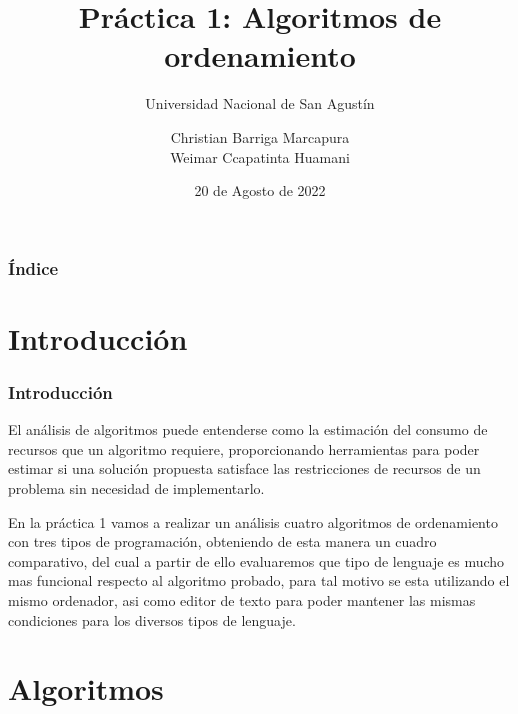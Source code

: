 \documentclass{beamer}
\title[Algoritmos y Estructura de datos]{Práctica 1: Algoritmos de ordenamiento}
\subtitle{Universidad Nacional de San Agustín}
\author{Christian Barriga Marcapura\\
        Weimar Ccapatinta Huamani}
\institute[Universidad Nacional de San Agustín]
{
  Universidad Nacional de San Agustín\\
    \and
    Seminario de Tesis\\
   \and
}
\date{20 de Agosto de 2022}
\begin{document}
\begin{frame}
  \frametitle{Índice}
  \tableofcontents
\end{frame}

\section{Introducción}
\begin{frame}
  \frametitle{Introducción}
  \begin{block}{}
El análisis de algoritmos puede entenderse como la estimación del consumo de recursos que un algoritmo requiere, proporcionando herramientas para poder estimar si una solución propuesta satisface las restricciones de recursos de un problema sin necesidad de implementarlo.
  \end{block}
    \begin{block}{}
  En la práctica 1 vamos a realizar un análisis cuatro algoritmos de ordenamiento con tres tipos de programación, obteniendo de esta manera un cuadro comparativo, del cual a partir de ello evaluaremos que tipo de lenguaje es mucho mas funcional respecto al algoritmo probado, para tal motivo se esta utilizando el mismo ordenador, asi como editor de texto para poder mantener las mismas condiciones para los diversos tipos de lenguaje.
  \end{block}
\end{frame}

\section{Algoritmos}
\end{document}
